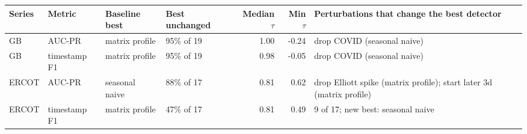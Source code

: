 \begin{tabular}{llllrrl}
\toprule
Series & Metric & Baseline best & Best unchanged & Median $\tau$ & Min $\tau$ & Perturbations that change the best detector \\
\midrule
GB & AUC-PR & matrix profile & 95\% of 19 & 1.00 & -0.24 & drop COVID (seasonal naive) \\
GB & timestamp F1 & matrix profile & 95\% of 19 & 0.98 & -0.05 & drop COVID (seasonal naive) \\
ERCOT & AUC-PR & seasonal naive & 88\% of 17 & 0.81 & 0.62 & drop Elliott spike (matrix profile); start later 3d (matrix profile) \\
ERCOT & timestamp F1 & matrix profile & 47\% of 17 & 0.81 & 0.49 & 9 of 17; new best: seasonal naive \\
\bottomrule
\end{tabular}
